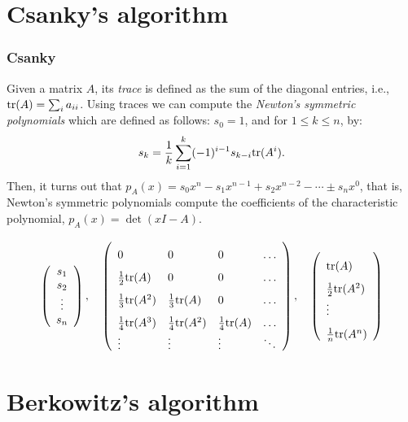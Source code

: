 \section{Csanky's algorithm}

\begin{frame}
\frametitle{Csanky}

Given a matrix $A$, its {\em trace} is defined as
the sum of the diagonal entries, i.e., $\mathrm{tr}(A)=\sum_ia_{ii}$. Using
traces we can compute the 
{\em Newton's symmetric polynomials} which
are defined as follows: $s_0=1$, and for $1\le k\le n$, by:
$$
s_k=\frac{1}{k}\sum_{i=1}^{k}(-1)^{i-1}s_{k-i}\mathrm{tr}(A^i).
$$
Then, it turns out that $p_A(x)=s_0x^n-s_1x^{n-1}+s_2x^{n-2}-\cdots\pm s_nx^0$,
that is, Newton's symmetric polynomials compute the coefficients of
the characteristic polynomial, $p_A(x)=\det(xI-A)$.
\end{frame}

\begin{frame}
$$
\left(\begin{array}{c} s_1\\s_2\\\vdots\\s_n \end{array}\right),
\quad
\left(\setlength{\extrarowheight}{8pt}\begin{array}{llll}
0                   & 0                   & 0                 & \ldots \\
\frac{1}{2}\tr(A)   & 0                   & 0                 & \ldots \\
\frac{1}{3}\tr(A^2) & \frac{1}{3}\tr(A)   & 0                 & \ldots \\
\frac{1}{4}\tr(A^3) & \frac{1}{4}\tr(A^2) & \frac{1}{4}\tr(A) & \ldots \\
\vdots              & \vdots              & \vdots            & \ddots
\end{array}\right),
\quad
\left(\setlength{\extrarowheight}{8pt}\begin{array}{l} 
\tr(A) \\
\frac{1}{2}\tr(A^2) \\
\vdots \\
\frac{1}{n}\tr(A^n)
\end{array}\right)
$$

\end{frame}

\section{Berkowitz's algorithm}

